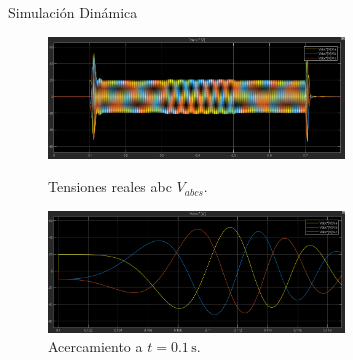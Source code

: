 \documentclass[12pt]{beamer}
\begin{document}
\begin{frame}{Simulación Dinámica}\scriptsize
\begin{figure}[H]
    \centering
    \begin{minipage}[t]{0.9\textwidth}
        \centering
        \includegraphics[width=0.7\textwidth]{Imagenes/ConsignasTensionABC.png}
        \caption{Tensiones reales abc \(V_{abcs}\).}
        \label{fig:TensionesRealesGlobalDT}
    \end{minipage}
    \begin{minipage}[t]{0.9\textwidth}
        \centering
        \includegraphics[width=0.7\textwidth]{Imagenes/ConsignasTensionABCacercamiento.png}
        \caption{Acercamiento a \(t = 0{.}1\,\text{s}\).}
        \label{fig:TensionesRealesAcercamientoGlobalDT}
    \end{minipage}
    \label{fig:SimulaciónTensionesCoordenadasReales}
\end{figure}
\end{frame}
\end{document}
